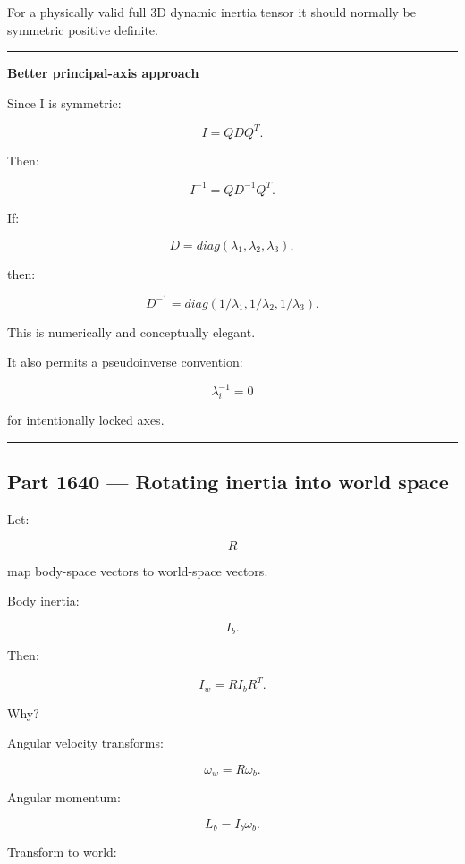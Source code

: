 For a physically valid full 3D dynamic inertia tensor it should normally be symmetric positive definite.

\begin{center}\rule{0.5\linewidth}{0.5pt}\end{center}

\textbf{Better principal-axis approach}

Since I is symmetric:

\[
I=QDQ^T.
\]

Then:

\[
I^{-1}
=
QD^{-1}Q^T.
\]

If:

\[
D=
diag(\lambda_1,\lambda_2,\lambda_3),
\]

then:

\[
D^{-1}
=
diag(
1/\lambda_1,
1/\lambda_2,
1/\lambda_3
).
\]

This is numerically and conceptually elegant.

It also permits a pseudoinverse convention:

\[
\lambda_i^{-1}=0
\]

for intentionally locked axes.

\begin{center}\rule{0.5\linewidth}{0.5pt}\end{center}

\subsection{Part 1640 --- Rotating inertia into world space}\label{06-engine-ii-ch035-part-1640-rotating-inertia-into-world-space}

\hypertarget{06-engine-ii-ch035-part-1640-rotating-inertia-into-world-space}{}

Let:

\[
R
\]

map body-space vectors to world-space vectors.

Body inertia:

\[
I_b.
\]

Then:

\[
\boxed{
I_w
=
RI_bR^T.
}
\]

Why?

Angular velocity transforms:

\[
\omega_w=
R\omega_b.
\]

Angular momentum:

\[
L_b=
I_b\omega_b.
\]

Transform to world:

